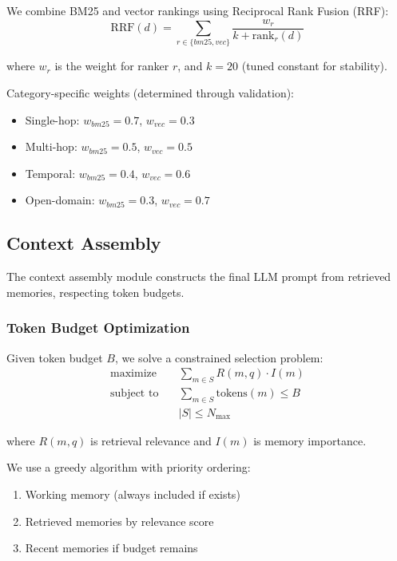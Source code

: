 We combine BM25 and vector rankings using Reciprocal Rank Fusion (RRF):
\begin{equation}
\text{RRF}(d) = \sum_{r \in \{bm25, vec\}} \frac{w_r}{k + \text{rank}_r(d)}
\end{equation}

where $w_r$ is the weight for ranker $r$, and $k = 20$ (tuned constant for stability).

Category-specific weights (determined through validation):
\begin{itemize}
    \item Single-hop: $w_{bm25} = 0.7$, $w_{vec} = 0.3$
    \item Multi-hop: $w_{bm25} = 0.5$, $w_{vec} = 0.5$
    \item Temporal: $w_{bm25} = 0.4$, $w_{vec} = 0.6$
    \item Open-domain: $w_{bm25} = 0.3$, $w_{vec} = 0.7$
\end{itemize}

\subsection{Context Assembly}

The context assembly module constructs the final LLM prompt from retrieved memories, respecting token budgets.

\subsubsection{Token Budget Optimization}

Given token budget $B$, we solve a constrained selection problem:
\begin{align}
\text{maximize} \quad & \sum_{m \in S} R(m, q) \cdot I(m) \\
\text{subject to} \quad & \sum_{m \in S} \text{tokens}(m) \leq B \\
& |S| \leq N_{\max}
\end{align}

where $R(m, q)$ is retrieval relevance and $I(m)$ is memory importance.

We use a greedy algorithm with priority ordering:
\begin{enumerate}
    \item Working memory (always included if exists)
    \item Retrieved memories by relevance score
    \item Recent memories if budget remains
\end{enumerate}

